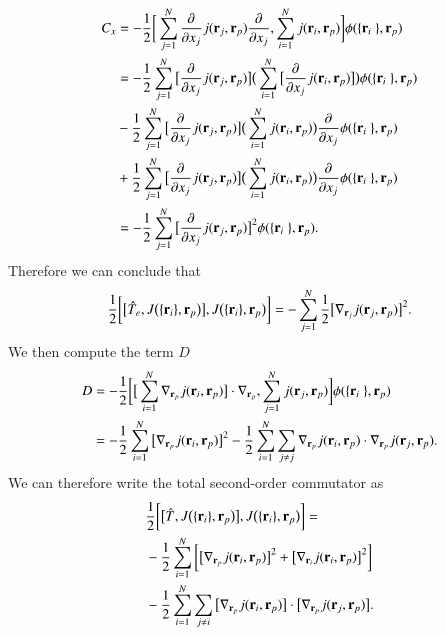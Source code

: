 \documentclass[aip,jcp,reprint,noshowkeys,superscriptaddress]{revtex4-1}
\newcommand{\deriv}[3]{\frac{\partial^{#3} #1}{\partial {#2}^{#3}}}
\newcommand{\bri}[1]{{\bf r}_{#1}}
\begin{document}
\begin{equation}
 \begin{aligned}
 C_x & = -\frac{1}{2}\bigg[\sum_{j=1}^N \deriv{}{x_j}{} j(\bri{j},\bri{p}) \deriv{}{x_j}{},\sum_{i=1}^Nj(\bri{i},\bri{p})   \bigg] \phi(\{ \bri{i} \},\bri{p}) \\
     & = -\frac{1}{2}\sum_{j=1}^N \big[\deriv{}{x_j}{} j(\bri{j},\bri{p})\big] \big(\sum_{i=1}^N \big[\deriv{}{x_j}{} j(\bri{i},\bri{p})\big]\big) \phi(\{ \bri{i} \},\bri{p}) \\
     &  - \frac{1}{2}\sum_{j=1}^N \big[\deriv{}{x_j}{} j(\bri{j},\bri{p})\big] \big( \sum_{i=1}^N j(\bri{i},\bri{p})\big) \deriv{}{x_j}{} \phi(\{ \bri{i} \},\bri{p}) \\
     &  + \frac{1}{2}\sum_{j=1}^N \big[\deriv{}{x_j}{} j(\bri{j},\bri{p})\big] \big( \sum_{i=1}^N j(\bri{i},\bri{p})\big) \deriv{}{x_j}{} \phi(\{ \bri{i} \},\bri{p}) \\
     & = -\frac{1}{2}\sum_{j=1}^N \big[\deriv{}{x_j}{} j(\bri{j},\bri{p})\big]^2 \phi(\{ \bri{i} \},\bri{p}).\\
 \end{aligned}
\end{equation}
Therefore we can conclude that 
\begin{equation}
\begin{aligned}
 \frac{1}{2}\bigg[\big[\hat{T}_e,J\big(\{\bri{i} \},\bri{p}\big)\big], J\big(\{\bri{i} \},\bri{p}\big) \bigg] = -\sum_{j=1}^N \frac{1}{2}\big[\nabla_{\bri{j}}j(\bri{j},\bri{p})\big]^2 .
\end{aligned}
\end{equation}
We then compute the term $D$
\begin{equation}
 \begin{aligned}
  D & = -\frac{1}{2} \bigg[ \big[\sum_{i=1}^N \nabla_{\bri{p}} j(\bri{i},\bri{p})\big] \cdot \nabla_{\bri{p}}, \sum_{j=1}^Nj(\bri{j},\bri{p})\bigg]\phi(\{ \bri{i} \},\bri{p})  \\
      & = -\frac{1}{2} \sum_{i=1}^N \big[ \nabla_{\bri{p}} j(\bri{i},\bri{p})\big]^2 -\frac{1}{2} \sum_{i=1}^N \sum_{j \ne j} \nabla_{\bri{p}} j(\bri{i},\bri{p}) \cdot \nabla_{\bri{p}} j(\bri{j},\bri{p}).
 \end{aligned}
\end{equation}
We can therefore write the total second-order commutator as 
\begin{equation}
 \begin{aligned}
 & \frac{1}{2}\bigg[ \big[\hat{T},J\big(\{\bri{i} \},\bri{p}\big) \big],J\big(\{\bri{i} \},\bri{p}\big) \bigg]  = \\ 
 &-\frac{1}{2} \sum_{i=1}^N \bigg[\big[ \nabla_{\bri{p}} j(\bri{i},\bri{p})\big]^2 + \big[ \nabla_{\bri{i}} j(\bri{i},\bri{p})\big]^2 \bigg] \\
 &-\frac{1}{2} \sum_{i=1}^N \sum_{j\ne i}\big[ \nabla_{\bri{p}} j(\bri{i},\bri{p})\big] \cdot \big[ \nabla_{\bri{p}} j(\bri{j},\bri{p})\big].
 \end{aligned}
\end{equation}
\end{document}
